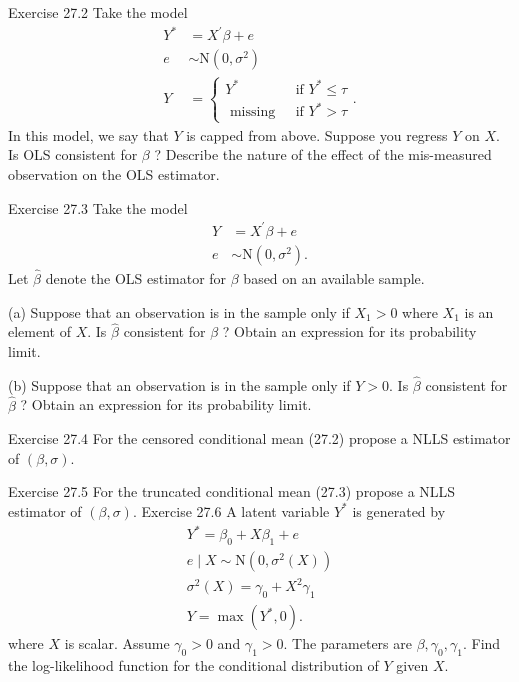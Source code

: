 \documentclass[10pt]{article}
\begin{document}
Exercise 27.2 Take the model
$$
\begin{aligned}
Y^{*} &=X^{\prime} \beta+e \\
e & \sim \mathrm{N}\left(0, \sigma^{2}\right) \\
Y &=\left\{\begin{array}{cc}
Y^{*} & \text { if } Y^{*} \leq \tau \\
\text { missing } & \text { if } Y^{*}>\tau
\end{array} .\right.
\end{aligned}
$$
In this model, we say that $Y$ is capped from above. Suppose you regress $Y$ on $X$. Is OLS consistent for $\beta$ ? Describe the nature of the effect of the mis-measured observation on the OLS estimator.

Exercise 27.3 Take the model
$$
\begin{aligned}
Y &=X^{\prime} \beta+e \\
e & \sim \mathrm{N}\left(0, \sigma^{2}\right) .
\end{aligned}
$$
Let $\widehat{\beta}$ denote the OLS estimator for $\beta$ based on an available sample.

(a) Suppose that an observation is in the sample only if $X_{1}>0$ where $X_{1}$ is an element of $X$. Is $\widehat{\beta}$ consistent for $\beta$ ? Obtain an expression for its probability limit.

(b) Suppose that an observation is in the sample only if $Y>0$. Is $\widehat{\beta}$ consistent for $\widehat{\beta}$ ? Obtain an expression for its probability limit.

Exercise 27.4 For the censored conditional mean (27.2) propose a NLLS estimator of $(\beta, \sigma)$.

Exercise 27.5 For the truncated conditional mean (27.3) propose a NLLS estimator of $(\beta, \sigma)$. Exercise 27.6 A latent variable $Y^{*}$ is generated by
$$
\begin{gathered}
Y^{*}=\beta_{0}+X \beta_{1}+e \\
e \mid X \sim \mathrm{N}\left(0, \sigma^{2}(X)\right) \\
\sigma^{2}(X)=\gamma_{0}+X^{2} \gamma_{1} \\
Y=\max \left(Y^{*}, 0\right) .
\end{gathered}
$$
where $X$ is scalar. Assume $\gamma_{0}>0$ and $\gamma_{1}>0$. The parameters are $\beta, \gamma_{0}, \gamma_{1}$. Find the log-likelihood function for the conditional distribution of $Y$ given $X$.
\end{document}
